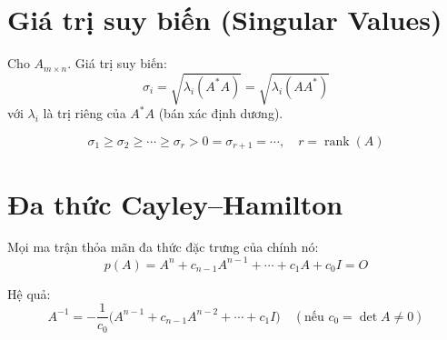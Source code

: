 \section{Giá trị suy biến (Singular Values)}

Cho $A_{m \times n}$. Giá trị suy biến:
\[
\sigma_i = \sqrt{\lambda_i(A^* A)} = \sqrt{\lambda_i(A A^*)}
\]
với $\lambda_i$ là trị riêng của $A^*A$ (bán xác định dương).

\[
\sigma_1 \ge \sigma_2 \ge \cdots \ge \sigma_r > 0 = \sigma_{r+1} = \cdots, \quad r = \operatorname{rank}(A)
\]

\section{Đa thức Cayley--Hamilton}

Mọi ma trận thỏa mãn đa thức đặc trưng của chính nó:
\[
p(A) = A^n + c_{n-1}A^{n-1} + \cdots + c_1 A + c_0 I = O
\]

Hệ quả:
\[
A^{-1} = -\frac{1}{c_0}\bigl(A^{n-1} + c_{n-1}A^{n-2} + \cdots + c_1 I\bigr) \quad (\text{nếu } c_0 = \det A \neq 0)
\]

